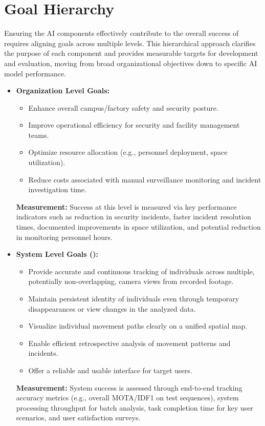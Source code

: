 \section{Goal Hierarchy}
\label{section:goal_hierarchy}
Ensuring the AI components effectively contribute to the overall success of \usevar{\srsTitle} requires aligning goals across multiple levels. This hierarchical approach clarifies the purpose of each component and provides measurable targets for development and evaluation, moving from broad organizational objectives down to specific AI model performance.
\begin{itemize}
    \item \textbf{Organization Level Goals:}
        \begin{itemize}
            \item Enhance overall campus/factory safety and security posture.
            \item Improve operational efficiency for security and facility management teams.
            \item Optimize resource allocation (e.g., personnel deployment, space utilization).
            \item Reduce costs associated with manual surveillance monitoring and incident investigation time.
        \end{itemize}
        \textbf{Measurement:} Success at this level is measured via key performance indicators such as reduction in security incidents, faster incident resolution times, documented improvements in space utilization, and potential reduction in monitoring personnel hours.
    \item \textbf{System Level Goals (\usevar{\srsTitle}):}
        \begin{itemize}
            \item Provide accurate and continuous tracking of individuals across multiple, potentially non-overlapping, camera views from recorded footage.
            \item Maintain persistent identity of individuals even through temporary disappearances or view changes in the analyzed data.
            \item Visualize individual movement paths clearly on a unified spatial map.
            \item Enable efficient retrospective analysis of movement patterns and incidents.
            \item Offer a reliable and usable interface for target users.
        \end{itemize}
        \textbf{Measurement:} System success is assessed through end-to-end tracking accuracy metrics (e.g., overall MOTA/IDF1 on test sequences), system processing throughput for batch analysis, task completion time for key user scenarios, and user satisfaction surveys.


\end{itemize}
